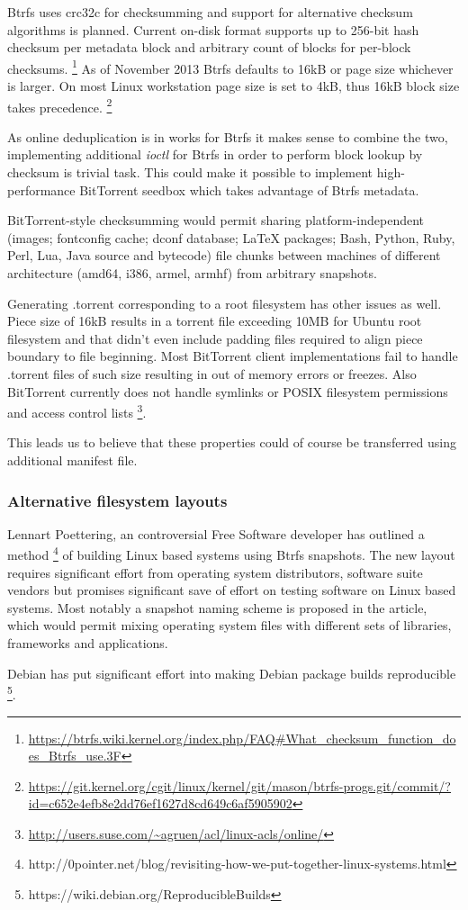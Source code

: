 \documentclass{article}
\begin{document}
Btrfs uses crc32c for checksumming and support for alternative checksum algorithms is planned.
Current on-disk format supports up to 256-bit hash checksum per
metadata block and arbitrary count of blocks for per-block checksums.
\footnote{\url{https://btrfs.wiki.kernel.org/index.php/FAQ#What_checksum_function_does_Btrfs_use.3F}}
As of November 2013 Btrfs defaults to 16kB or page size whichever
is larger.
On most Linux workstation page size is set to 4kB, thus 16kB block
size takes precedence.
\footnote{\url{https://git.kernel.org/cgit/linux/kernel/git/mason/btrfs-progs.git/commit/?id=c652e4efb8e2dd76ef1627d8cd649c6af5905902}}

As online deduplication is in works for Btrfs it makes sense to
combine the two, implementing additional \emph{ioctl} for Btrfs in
order to perform block lookup by checksum is trivial task.
This could make it possible to implement high-performance
BitTorrent seedbox which takes advantage of Btrfs metadata.

BitTorrent-style checksumming would permit sharing platform-independent
(images; fontconfig cache; dconf database; LaTeX packages;
Bash, Python, Ruby, Perl, Lua, Java source and bytecode)
file chunks between machines of different architecture (amd64, i386, armel, armhf)
from arbitrary snapshots.

Generating .torrent corresponding to a root filesystem has other issues
as well.
Piece size of 16kB results in a torrent file
exceeding 10MB for Ubuntu root filesystem and that didn't even
include padding files required to align piece boundary to file beginning.
Most BitTorrent client implementations fail to handle .torrent
files of such size resulting in out of memory errors or freezes.
Also BitTorrent currently does not handle symlinks or POSIX
filesystem permissions and access control lists
\footnote{\url{http://users.suse.com/~agruen/acl/linux-acls/online/}}.

This leads us to believe that
these properties could of course be transferred
using additional manifest file.


\subsubsection{Alternative filesystem layouts}

Lennart Poettering, an controversial Free Software developer has outlined a method
\footnote{http://0pointer.net/blog/revisiting-how-we-put-together-linux-systems.html}
of building Linux based systems using Btrfs snapshots.
The new layout requires significant effort from operating system distributors,
software suite vendors but promises significant save of effort on testing
software on Linux based systems.
Most notably a snapshot naming scheme is proposed in the article,
which would permit mixing operating system files with different
sets of libraries, frameworks and applications.




Debian has put significant effort into making Debian package builds reproducible
\footnote{https://wiki.debian.org/ReproducibleBuilds}.





\end{document}
